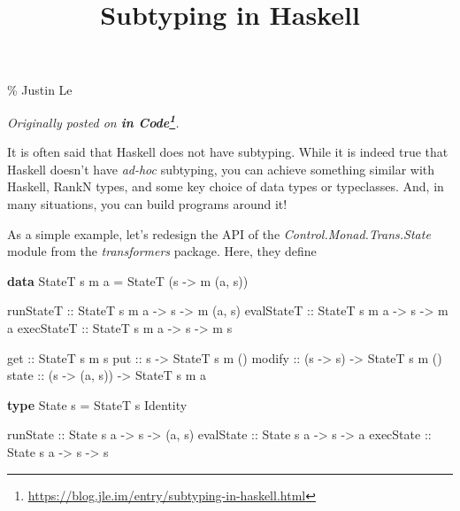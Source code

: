 \documentclass[]{article}
\title{Subtyping in Haskell}
\newenvironment{Shaded}{}{}
\newcommand{\DataTypeTok}[1]{\textcolor[rgb]{0.56,0.13,0.00}{#1}}
\newcommand{\KeywordTok}[1]{\textcolor[rgb]{0.00,0.44,0.13}{\textbf{#1}}}
\newcommand{\NormalTok}[1]{#1}
\newcommand{\OtherTok}[1]{\textcolor[rgb]{0.00,0.44,0.13}{#1}}
\renewcommand{\href}[2]{#2\footnote{\url{#1}}}
\begin{document}
\maketitle

\% Justin Le

\emph{Originally posted on
\textbf{\href{https://blog.jle.im/entry/subtyping-in-haskell.html}{in Code}}.}

It is often said that Haskell does not have subtyping. While it is indeed true
that Haskell doesn't have \emph{ad-hoc} subtyping, you can achieve something
similar with Haskell, RankN types, and some key choice of data types or
typeclasses. And, in many situations, you can build programs around it!

As a simple example, let's redesign the API of the
\emph{Control.Monad.Trans.State} module from the \emph{transformers} package.
Here, they define

\begin{Shaded}
\begin{Highlighting}[]
\KeywordTok{data} \DataTypeTok{StateT}\NormalTok{ s m a }\OtherTok{=} \DataTypeTok{StateT}\NormalTok{ (s }\OtherTok{{-}\textgreater{}}\NormalTok{ m (a, s))}

\OtherTok{runStateT  ::} \DataTypeTok{StateT}\NormalTok{ s m a }\OtherTok{{-}\textgreater{}}\NormalTok{ s }\OtherTok{{-}\textgreater{}}\NormalTok{ m (a, s)}
\OtherTok{evalStateT ::} \DataTypeTok{StateT}\NormalTok{ s m a }\OtherTok{{-}\textgreater{}}\NormalTok{ s }\OtherTok{{-}\textgreater{}}\NormalTok{ m a}
\OtherTok{execStateT ::} \DataTypeTok{StateT}\NormalTok{ s m a }\OtherTok{{-}\textgreater{}}\NormalTok{ s }\OtherTok{{-}\textgreater{}}\NormalTok{ m s}

\OtherTok{get    ::}                  \DataTypeTok{StateT}\NormalTok{ s m s}
\OtherTok{put    ::}\NormalTok{ s             }\OtherTok{{-}\textgreater{}} \DataTypeTok{StateT}\NormalTok{ s m ()}
\OtherTok{modify ::}\NormalTok{ (s }\OtherTok{{-}\textgreater{}}\NormalTok{ s)      }\OtherTok{{-}\textgreater{}} \DataTypeTok{StateT}\NormalTok{ s m ()}
\OtherTok{state  ::}\NormalTok{ (s }\OtherTok{{-}\textgreater{}}\NormalTok{ (a, s)) }\OtherTok{{-}\textgreater{}} \DataTypeTok{StateT}\NormalTok{ s m a}

\KeywordTok{type} \DataTypeTok{State}\NormalTok{ s }\OtherTok{=} \DataTypeTok{StateT}\NormalTok{ s }\DataTypeTok{Identity}

\OtherTok{runState  ::} \DataTypeTok{State}\NormalTok{ s a  }\OtherTok{{-}\textgreater{}}\NormalTok{ s }\OtherTok{{-}\textgreater{}}\NormalTok{ (a, s)}
\OtherTok{evalState ::} \DataTypeTok{State}\NormalTok{ s a }\OtherTok{{-}\textgreater{}}\NormalTok{ s }\OtherTok{{-}\textgreater{}}\NormalTok{ a}
\OtherTok{execState ::} \DataTypeTok{State}\NormalTok{ s a }\OtherTok{{-}\textgreater{}}\NormalTok{ s }\OtherTok{{-}\textgreater{}}\NormalTok{ s}
\end{Highlighting}
\end{Shaded}
\end{document}
